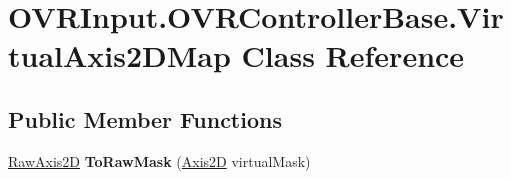 \hypertarget{class_o_v_r_input_1_1_o_v_r_controller_base_1_1_virtual_axis2_d_map}{}\section{O\+V\+R\+Input.\+O\+V\+R\+Controller\+Base.\+Virtual\+Axis2\+D\+Map Class Reference}
\label{class_o_v_r_input_1_1_o_v_r_controller_base_1_1_virtual_axis2_d_map}
\subsection*{Public Member Functions}
\begin{DoxyCompactItemize}
\item 
\mbox{\label{class_o_v_r_input_1_1_o_v_r_controller_base_1_1_virtual_axis2_d_map_ab09b4f9f469e21281f08e606d5b34494}} 
\mbox{\hyperlink{class_o_v_r_input_a973c161bfb3bd6d0cc16c3a0b56c9f4a}{Raw\+Axis2D}} {\bfseries To\+Raw\+Mask} (\mbox{\hyperlink{class_o_v_r_input_a8d8de8321e36e4c5c3b5266b72468d8a}{Axis2D}} virtual\+Mask)
\end{DoxyCompactItemize}
